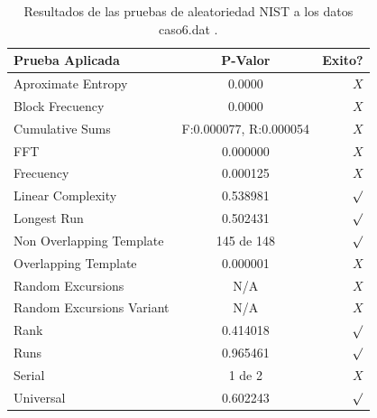 \documentclass[10pt]{IEEEtran}
\begin{document}
\begin{table}[H]
\caption{Resultados de las pruebas de aleatoriedad NIST a los datos caso6.dat .}
\label{caso1}
\begin{center}
\begin{small}
\begin{tabular}{|l|c|r|}
\hline

Prueba Aplicada &  P-Valor & Exito? \\
\hline

Aproximate Entropy    &    0.0000 & $X$ \\

Block Frecuency  & 0.0000  &  $X$  \\

Cumulative Sums    &   F:0.000077, R:0.000054   & $X$ \\

FFT    &   0.000000 &   $X$      \\

Frecuency     &  0.000125 &  $X$   \\

Linear Complexity      & 0.538981 & $\surd$ \\

Longest Run      &   0.502431 &   $\surd$     \\

Non Overlapping Template      & 145 de 148    &    $\surd$          \\

Overlapping Template      &   0.000001  &       $X$        \\

Random Excursions      & N/A  &    $X$      \\

Random Excursions Variant & N/A &     $X$    \\

Rank &  0.414018  &      $\surd$      \\

Runs &    0.965461 &       $\surd$        \\

Serial &     1 de 2    &     $X$        \\

Universal &        0.602243 &   $\surd$            \\

\hline

\end{tabular}
\end{small}
\end{center}
\end{table}
\end{document}
